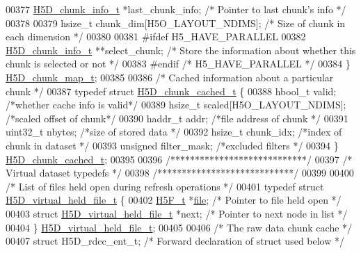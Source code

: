 \begin{DoxyCode}
00377     \hyperlink{struct_h5_d__chunk__info__t}{H5D\_chunk\_info\_t} *last\_chunk\_info;  \textcolor{comment}{/* Pointer to last chunk's info */}
00378 
00379     hsize\_t chunk\_dim[H5O\_LAYOUT\_NDIMS];    \textcolor{comment}{/* Size of chunk in each dimension */}
00380 
00381 \textcolor{preprocessor}{#ifdef H5\_HAVE\_PARALLEL}
00382     \hyperlink{struct_h5_d__chunk__info__t}{H5D\_chunk\_info\_t} **select\_chunk;    \textcolor{comment}{/* Store the information about whether this chunk
       is selected or not */}
00383 \textcolor{preprocessor}{#endif }\textcolor{comment}{/* H5\_HAVE\_PARALLEL */}\textcolor{preprocessor}{}
00384 \} \hyperlink{struct_h5_d__chunk__map__t}{H5D\_chunk\_map\_t};
00385 
00386 \textcolor{comment}{/* Cached information about a particular chunk */}
00387 \textcolor{keyword}{typedef} \textcolor{keyword}{struct }\hyperlink{struct_h5_d__chunk__cached__t}{H5D\_chunk\_cached\_t} \{
00388     hbool\_t     valid;                          \textcolor{comment}{/*whether cache info is valid*/}
00389     hsize\_t scaled[H5O\_LAYOUT\_NDIMS];   \textcolor{comment}{/*scaled offset of chunk*/}
00390     haddr\_t addr;               \textcolor{comment}{/*file address of chunk */}
00391     uint32\_t    nbytes;             \textcolor{comment}{/*size of stored data   */}
00392     hsize\_t     chunk\_idx;          \textcolor{comment}{/*index of chunk in dataset */}
00393     \textcolor{keywordtype}{unsigned}    filter\_mask;            \textcolor{comment}{/*excluded filters  */}
00394 \} \hyperlink{struct_h5_d__chunk__cached__t}{H5D\_chunk\_cached\_t};
00395 
00396 \textcolor{comment}{/****************************/}
00397 \textcolor{comment}{/* Virtual dataset typedefs */}
00398 \textcolor{comment}{/****************************/}
00399 
00400 \textcolor{comment}{/* List of files held open during refresh operations */}
00401 \textcolor{keyword}{typedef} \textcolor{keyword}{struct }\hyperlink{struct_h5_d__virtual__held__file__t}{H5D\_virtual\_held\_file\_t} \{
00402     \hyperlink{struct_h5_f__t}{H5F\_t} *\hyperlink{structfile}{file};                                \textcolor{comment}{/* Pointer to file held open */}
00403     \textcolor{keyword}{struct }\hyperlink{struct_h5_d__virtual__held__file__t}{H5D\_virtual\_held\_file\_t} *next;       \textcolor{comment}{/* Pointer to next node in list */}
00404 \} \hyperlink{struct_h5_d__virtual__held__file__t}{H5D\_virtual\_held\_file\_t};
00405 
00406 \textcolor{comment}{/* The raw data chunk cache */}
00407 \textcolor{keyword}{struct }H5D\_rdcc\_ent\_t;  \textcolor{comment}{/* Forward declaration of struct used below */}

\end{DoxyCode}
